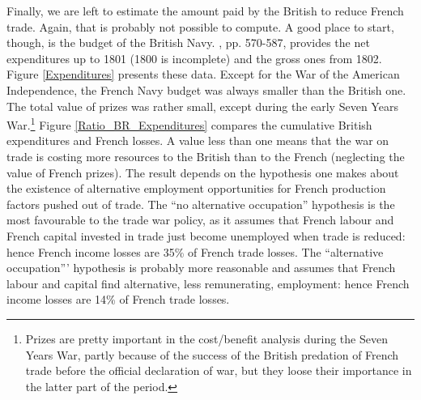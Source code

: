 \documentclass[12pt,a4paper,notitlepage,english]{article}
\begin{document}
Finally, we are left to estimate the amount paid by the British to reduce French trade. Again, that is probably not possible to compute. A good place to start, though, is the budget of the British Navy. \cite{mitchell1988}, pp. 570-587, provides the net expenditures up to 1801 (1800 is incomplete) and the gross ones from 1802.
Figure \ref{Expenditures} presents these data. Except for the War of the American Independence, the French Navy budget was always smaller than the British one. The total value of prizes was rather small, except during the early Seven Years War.\footnote{Prizes are pretty important in the cost/benefit analysis during the Seven Years War, partly because of the success of the British predation of French trade before the official declaration of war, but they loose their importance in the latter part of the period.}
Figure \ref{Ratio_BR_Expenditures} compares the cumulative British expenditures and French losses. A value less than one means that the war on trade is costing more resources to the British than to the French (neglecting the value of French prizes). 
The result depends on the hypothesis one makes about the existence of alternative employment opportunities for French production factors pushed out of trade. The ``no alternative occupation'' hypothesis is the most favourable to the trade war policy, as it assumes that French labour and French capital invested in trade just become unemployed when trade is reduced: hence French income losses are 35\% of French trade losses. The ``alternative occupation''' hypothesis is probably more reasonable and assumes that French labour and capital find alternative, less remunerating, employment: hence French income losses are 14\% of French trade losses.
\end{document}
